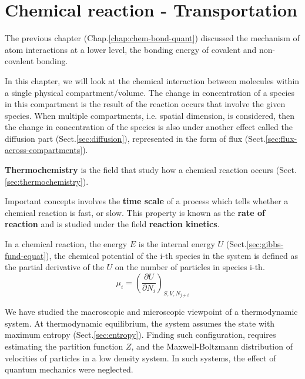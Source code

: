 \chapter{Chemical reaction - Transportation}
\label{chap:chem-react-transp}

\def\A{{\text{A}}}
\def\B{{\text{B}}}
\def\C{{\text{C}}}
\def\D{{\text{D}}}

The previous chapter (Chap.\ref{chap:chem-bond-quant}) discussed the mechanism
of atom interactions at a lower level, the bonding energy of covalent and
non-covalent bonding.

In this chapter, we will look at the chemical interaction between molecules
within a single physical compartment/volume. The change in concentration of a
species in this compartment is the result of the reaction occurs that involve
the given species. When multiple compartments, i.e. spatial dimension, is
considered, then the change in concentration of the species is also under
another effect called the diffusion part (Sect.\ref{sec:diffusion}), represented
in the form of flux (Sect.\ref{sec:flux-across-compartments}).

{\bf Thermochemistry} is the field that study how a chemical reaction occurs
(Sect.\ref{sec:thermochemistry}).

Important concepts involves the {\bf time scale} of a
process which tells whether a chemical reaction is fast, or slow. This
property is known as the {\bf rate of reaction} and is studied under
the field {\bf reaction kinetics}.

In a chemical reaction, the energy $E$ is the internal energy $U$
(Sect.\ref{sec:gibbs-fund-equat}), the chemical potential of the i-th species in
the system is defined as the partial derivative of the $U$ on the number of particles in species
i-th.
\begin{equation}
  \label{eq:chem_potential}
  \mu_i = \left( \frac{\partial U}{\partial N_i} \right)_{S,V,N_{j \ne i}}
\end{equation}

We have studied the macroscopic and microscopic viewpoint of a thermodynamic
system. At thermodynamic equilibrium, the system assumes the state with maximum
entropy (Sect.\ref{sec:entropy}). Finding such configuration, requires
estimating the partition function $Z$, and the Maxwell-Boltzmann distribution of
velocities of particles in a low density system. In such systems, the effect of
quantum mechanics were neglected.



